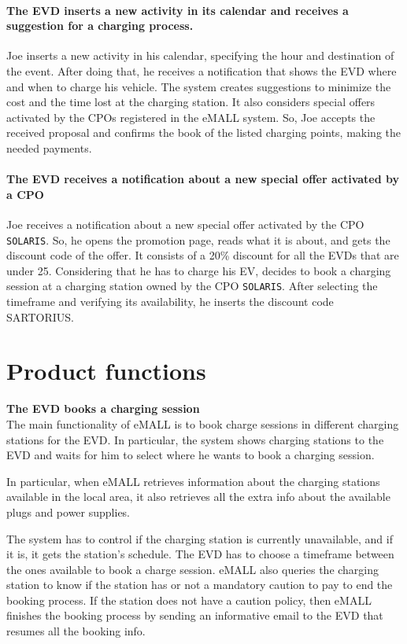 \paragraph{The EVD inserts a new activity in its calendar and receives a suggestion for a charging process.}
Joe inserts a new activity in his calendar, specifying the hour and destination of the event.
After doing that, he receives a notification that shows the EVD where and when to charge his vehicle.
The system creates suggestions to minimize the cost and the time lost at the charging station.
It also considers special offers activated by the CPOs registered in the eMALL system.
So, Joe accepts the received proposal and confirms the book of the listed charging points, making the needed payments.

\paragraph{The EVD receives a notification about a new special offer activated by a CPO}
Joe receives a notification about a new special offer activated by the CPO \verb|SOLARIS|.
So, he opens the promotion page, reads what it is about, and gets the discount code of the offer.
It consists of a 20\% discount for all the EVDs that are under 25.
Considering that he has to charge his EV, decides to book a charging session at a charging station owned by the CPO \verb|SOLARIS|.
After selecting the timeframe and verifying its availability, he inserts the discount code SARTORIUS\@.


\section{Product functions}
\label{sec:product_functions}%
\textbf{The EVD books a charging session}\\
The main functionality of eMALL is to book charge sessions in different charging stations for the EVD\@.
In particular, the system shows charging stations to the EVD and waits for him to select where he wants to book a charging session.

In particular, when eMALL retrieves information about the charging stations available in the local area, it also retrieves all the extra info about the available plugs and power supplies.

The system has to control if the charging station is currently unavailable, and if it is, it gets the station's schedule.
The EVD has to choose a timeframe between the ones available to book a charge session.
eMALL also queries the charging station to know if the station has or not a mandatory caution to pay to end the booking process.
If the station does not have a caution policy, then eMALL finishes the booking process by sending an informative email to the EVD that resumes all the booking info.

